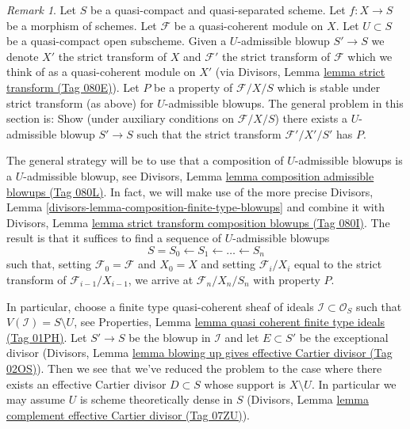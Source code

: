 \documentclass{amsart}
\theoremstyle{plain}
\theoremstyle{definition}
\theoremstyle{remark}
\newtheorem{remark}[subsection]{Remark}
\numberwithin{equation}{subsection}
\begin{document}
\begin{remark}
\label{remark-successive-blowups}
Let $S$ be a quasi-compact and quasi-separated scheme. Let $f : X \to S$
be a morphism of schemes. Let $\mathcal{F}$ be a quasi-coherent module on $X$.
Let $U \subset S$ be a quasi-compact open subscheme. Given a $U$-admissible
blowup $S' \to S$ we denote $X'$ the strict transform of $X$ and $\mathcal{F}'$
the strict transform of $\mathcal{F}$ which we think of as a quasi-coherent
module on $X'$ (via Divisors, Lemma \href{https://stacks.math.columbia.edu/tag/080E}{lemma strict transform (Tag 080E)}).
Let $P$ be a property of $\mathcal{F}/X/S$ which is stable under strict
transform (as above) for $U$-admissible blowups. The general problem in
this section is: Show (under auxiliary conditions on $\mathcal{F}/X/S$)
there exists a $U$-admissible blowup $S' \to S$
such that the strict transform $\mathcal{F}'/X'/S'$ has $P$.

\medskip\noindent
The general strategy will be to use that a composition of
$U$-admissible blowups is a $U$-admissible blowup, see
Divisors, Lemma \href{https://stacks.math.columbia.edu/tag/080L}{lemma composition admissible blowups (Tag 080L)}.
In fact, we will make use of the more precise
Divisors, Lemma \ref{divisors-lemma-composition-finite-type-blowups}
and combine it with
Divisors, Lemma \href{https://stacks.math.columbia.edu/tag/080I}{lemma strict transform composition blowups (Tag 080I)}.
The result is that it suffices to find a sequence of $U$-admissible
blowups
$$
S = S_0 \leftarrow S_1 \leftarrow \ldots \leftarrow S_n
$$
such that, setting $\mathcal{F}_0 = \mathcal{F}$ and $X_0 = X$ and setting
$\mathcal{F}_i/X_i$ equal to the strict transform of
$\mathcal{F}_{i - 1}/X_{i - 1}$, we
arrive at $\mathcal{F}_n/X_n/S_n$ with property $P$.

\medskip\noindent
In particular, choose a finite type quasi-coherent sheaf of ideals
$\mathcal{I} \subset \mathcal{O}_S$ such that $V(\mathcal{I}) = S \setminus U$,
see Properties, Lemma \href{https://stacks.math.columbia.edu/tag/01PH}{lemma quasi coherent finite type ideals (Tag 01PH)}.
Let $S' \to S$ be the blowup in $\mathcal{I}$ and let $E \subset S'$
be the exceptional divisor (Divisors, Lemma
\href{https://stacks.math.columbia.edu/tag/02OS}{lemma blowing up gives effective Cartier divisor (Tag 02OS)}).
Then we see that we've reduced the
problem to the case where there exists an effective Cartier divisor
$D \subset S$ whose support is $X \setminus U$. In particular we may
assume $U$ is scheme theoretically dense in $S$
(Divisors, Lemma \href{https://stacks.math.columbia.edu/tag/07ZU}{lemma complement effective Cartier divisor (Tag 07ZU)}).


\end{remark}
\end{document}
